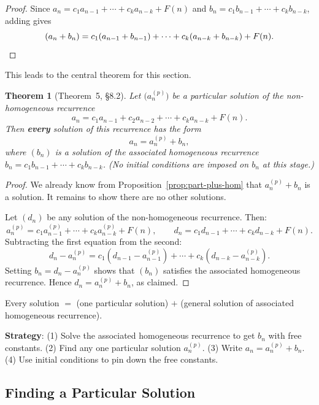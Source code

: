 \documentclass[11pt, a4paper, notitlepage]{report}
\newtheorem{theorem}{Theorem}[section]
\theoremstyle{definition}
\theoremstyle{remark}
\begin{document}
\begin{proof}
Since $a_n = c_1 a_{n-1} + \cdots + c_k a_{n-k} + F(n)$ and
$b_n = c_1 b_{n-1} + \cdots + c_k b_{n-k}$, adding gives
\[
  (a_n + b_n) = c_1(a_{n-1}+b_{n-1}) + \cdots + c_k(a_{n-k}+b_{n-k}) + F(n). \qedhere
\]
\end{proof}

This leads to the central theorem for this section.

\begin{theorem}[Theorem~5, \S8.2]
\label{thm:lnhrr}
Let $\bigl(a_n^{(p)}\bigr)$ be a \emph{particular} solution of the non-homogeneous
recurrence
\[
  a_n = c_1 a_{n-1} + c_2 a_{n-2} + \cdots + c_k a_{n-k} + F(n).
\]
Then \textbf{every} solution of this recurrence has the form
\[
  a_n = a_n^{(p)} + b_n,
\]
where $(b_n)$ is a solution of the associated homogeneous recurrence
$b_n = c_1 b_{n-1} + \cdots + c_k b_{n-k}$.
(No initial conditions are imposed on $b_n$ at this stage.)
\end{theorem}

\begin{proof}
We already know from Proposition~\ref{prop:part-plus-hom} that $a_n^{(p)} + b_n$ is a
solution.  It remains to show there are no other solutions.

Let $(d_n)$ be any solution of the non-homogeneous recurrence.  Then:
\[
  a_n^{(p)} = c_1 a_{n-1}^{(p)} + \cdots + c_k a_{n-k}^{(p)} + F(n), \qquad
  d_n = c_1 d_{n-1} + \cdots + c_k d_{n-k} + F(n).
\]
Subtracting the first equation from the second:
\[
  d_n - a_n^{(p)} = c_1\!\left(d_{n-1}-a_{n-1}^{(p)}\right) + \cdots +
                    c_k\!\left(d_{n-k}-a_{n-k}^{(p)}\right).
\]
Setting $b_n = d_n - a_n^{(p)}$ shows that $(b_n)$ satisfies the associated homogeneous
recurrence.  Hence $d_n = a_n^{(p)} + b_n$, as claimed.
\end{proof}

\begin{keyresult}[title={Key Result: Theorem 5 (Structure Theorem)}]
Every solution $=$ (one particular solution) $+$ (general solution of associated homogeneous recurrence).

\textbf{Strategy}: (1) Solve the associated homogeneous recurrence to get $b_n$ with free constants.
(2) Find any one particular solution $a_n^{(p)}$.
(3) Write $a_n = a_n^{(p)} + b_n$.
(4) Use initial conditions to pin down the free constants.
\end{keyresult}

\subsection{Finding a Particular Solution}
\label{subsec:particular}
\end{document}
